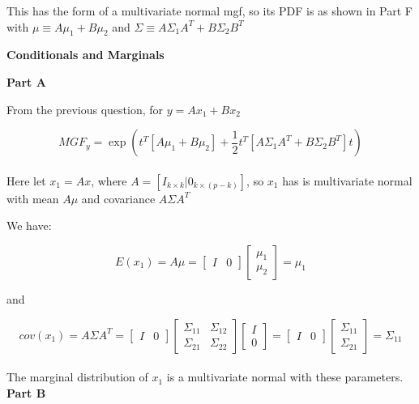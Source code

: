 \documentclass[12pt]{amsart}
\begin{document}
This has the form of a multivariate normal mgf, so its PDF is as shown in Part F with     $\mu \equiv A\mu_1+B\mu_2$ and $\Sigma \equiv A\Sigma_1A^T+B\Sigma_2 B^T$\\
\bigskip

{\bf \large Conditionals and Marginals} 
\bigskip

\bigskip

{\bf Part A}\\
\bigskip



From the previous question, for $y = Ax_1 + Bx_2$

 $$ MGF_y= \exp\left( t^T[A\mu_1 + B\mu_2] + \frac{1}{2}t^T[A\Sigma_1A^T+B\Sigma_2 B^T]t          \right)  $$\\

Here let $x_1 = Ax$, where $A = [I_{k \times k} | 0_{k\times(p-k)}]$, so $x_1$ has is multivariate normal with mean  $ A \mu$ and covariance $A\Sigma A^T$

We have:

$$ E(x_1) = A\mu = \begin{bmatrix}
I & 0 
\end{bmatrix}   \begin{bmatrix}
\mu_1 \\
\mu_2 
\end{bmatrix}  = \mu_1$$

and

$$ cov(x_1) = A\Sigma A^T = \begin{bmatrix}
I & 0 
\end{bmatrix} \begin{bmatrix}
\Sigma_{11} & \Sigma_{12} \\
\Sigma_{21} & \Sigma_{22} 
\end{bmatrix}   \begin{bmatrix}
I \\
0
\end{bmatrix} = \begin{bmatrix}
I & 0 
\end{bmatrix}  \begin{bmatrix}
\Sigma_{11} \\
\Sigma_{21} 
\end{bmatrix} = \Sigma_{11}
$$\\

The marginal distribution of $x_1$ is a multivariate normal with these parameters.\\


{\bf Part B}\\
\bigskip
\end{document}
